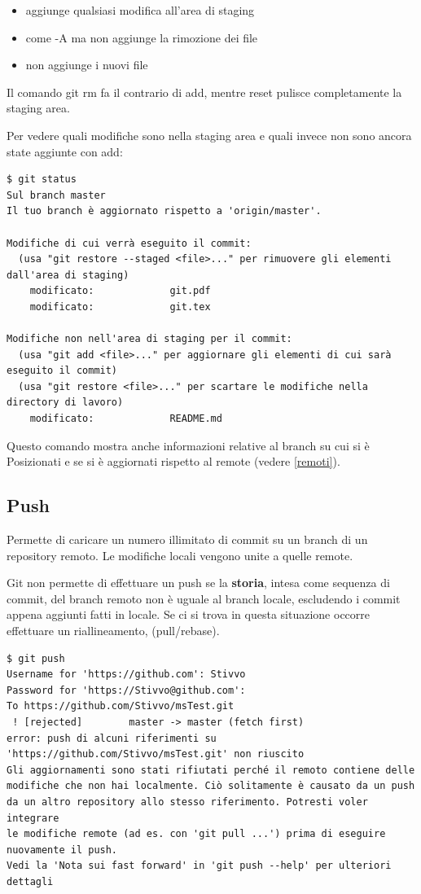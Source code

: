 \documentclass{article} \usepackage[textwidth=19cm,textheight=24cm]{geometry}
\begin{document}
\begin{itemize}
    \item {} aggiunge qualsiasi modifica all'area di staging
    \item {} come -A ma non aggiunge la rimozione dei file
    \item {} non aggiunge i nuovi file
\end{itemize}

Il comando git rm fa il contrario di add, mentre reset pulisce completamente la
staging area.

Per vedere quali modifiche sono nella staging area e quali invece non sono
ancora state aggiunte con add:

\begin{verbatim}
$ git status
Sul branch master
Il tuo branch è aggiornato rispetto a 'origin/master'.

Modifiche di cui verrà eseguito il commit:
  (usa "git restore --staged <file>..." per rimuovere gli elementi dall'area di staging)
	modificato:             git.pdf
	modificato:             git.tex

Modifiche non nell'area di staging per il commit:
  (usa "git add <file>..." per aggiornare gli elementi di cui sarà eseguito il commit)
  (usa "git restore <file>..." per scartare le modifiche nella directory di lavoro)
	modificato:             README.md
\end{verbatim}

Questo comando mostra anche informazioni relative al branch su cui si è
Posizionati e se si è aggiornati rispetto al remote (vedere \ref{remoti}).

\subsection{Push}

Permette di caricare un numero illimitato di commit su un branch di un
repository remoto. Le modifiche locali vengono unite a quelle remote.

Git non permette di effettuare un push se la \textbf{storia}, intesa come sequenza di commit,
del branch remoto non è uguale al branch locale, escludendo i commit
appena aggiunti fatti in locale. Se ci si trova in questa situazione occorre effettuare un riallineamento,
(pull/rebase).

\begin{verbatim}
$ git push
Username for 'https://github.com': Stivvo
Password for 'https://Stivvo@github.com':
To https://github.com/Stivvo/msTest.git
 ! [rejected]        master -> master (fetch first)
error: push di alcuni riferimenti su 'https://github.com/Stivvo/msTest.git' non riuscito
Gli aggiornamenti sono stati rifiutati perché il remoto contiene delle
modifiche che non hai localmente. Ciò solitamente è causato da un push
da un altro repository allo stesso riferimento. Potresti voler integrare
le modifiche remote (ad es. con 'git pull ...') prima di eseguire
nuovamente il push.
Vedi la 'Nota sui fast forward' in 'git push --help' per ulteriori
dettagli
\end{verbatim}
\end{document}
